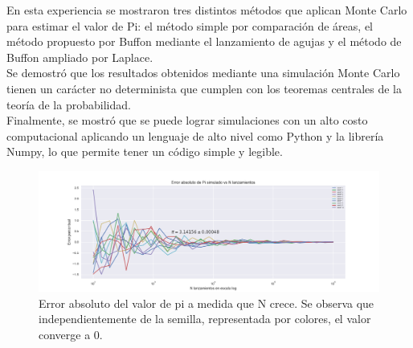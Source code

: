 \documentclass{rbf}
\begin{document}
En esta experiencia se mostraron tres distintos métodos que aplican Monte Carlo para estimar el valor de Pi: el método simple por comparación de áreas, el método propuesto por Buffon mediante el lanzamiento de agujas y el método de Buffon ampliado por Laplace. \\
Se demostró que los resultados obtenidos mediante una simulación Monte Carlo tienen un carácter no determinista que cumplen con los teoremas centrales de la teoría de la probabilidad. \\

Finalmente, se mostró que se puede lograr simulaciones con un alto costo computacional aplicando un lenguaje de alto nivel como Python y la librería Numpy, lo que permite tener un código simple y legible.
\begin{figure}[tbf]
  \includegraphics[scale=0.5]{figures/errors_uniforme.png}
	\caption{Error absoluto del valor de pi a medida que N crece. Se observa que independientemente de la semilla, representada por colores, el valor converge a 0.}
 \label{buff4}
\end{figure}


                                                                     
\end{document}
